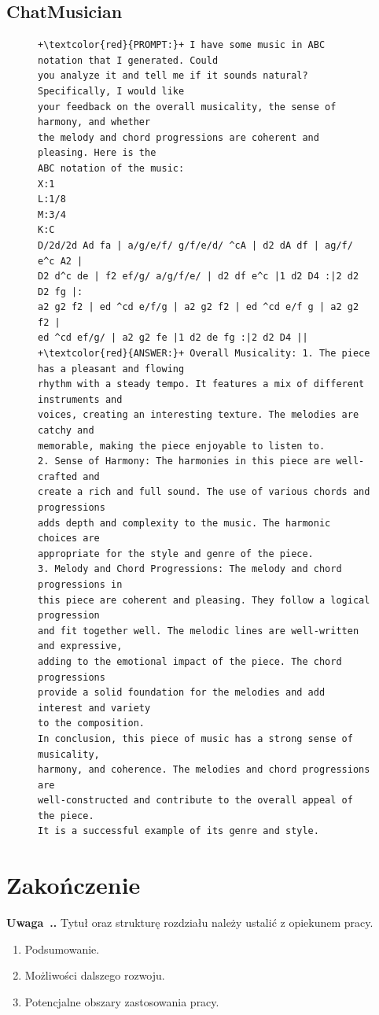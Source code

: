 \documentclass[data-science]{agh-wi} %
\newcounter{comment}[chapter]
\newenvironment{comment}[1][]{\begin{shaded}\refstepcounter{comment}
\noindent \textbf{Uwaga~\thechapter.\thecomment. #1} \rmfamily}{\end{shaded}}
\begin{document}
\section{ChatMusician}
\begin{figure}[ht!]
    \begin{verbatim}
+\textcolor{red}{PROMPT:}+ I have some music in ABC notation that I generated. Could
you analyze it and tell me if it sounds natural? Specifically, I would like 
your feedback on the overall musicality, the sense of harmony, and whether 
the melody and chord progressions are coherent and pleasing. Here is the 
ABC notation of the music:
X:1
L:1/8
M:3/4
K:C
D/2d/2d Ad fa | a/g/e/f/ g/f/e/d/ ^cA | d2 dA df | ag/f/ e^c A2 | 
D2 d^c de | f2 ef/g/ a/g/f/e/ | d2 df e^c |1 d2 D4 :|2 d2 D2 fg |:
a2 g2 f2 | ed ^cd e/f/g | a2 g2 f2 | ed ^cd e/f g | a2 g2 f2 | 
ed ^cd ef/g/ | a2 g2 fe |1 d2 de fg :|2 d2 D4 ||
+\textcolor{red}{ANSWER:}+ Overall Musicality: 1. The piece has a pleasant and flowing 
rhythm with a steady tempo. It features a mix of different instruments and
voices, creating an interesting texture. The melodies are catchy and 
memorable, making the piece enjoyable to listen to.
2. Sense of Harmony: The harmonies in this piece are well-crafted and 
create a rich and full sound. The use of various chords and progressions 
adds depth and complexity to the music. The harmonic choices are 
appropriate for the style and genre of the piece.
3. Melody and Chord Progressions: The melody and chord progressions in 
this piece are coherent and pleasing. They follow a logical progression 
and fit together well. The melodic lines are well-written and expressive, 
adding to the emotional impact of the piece. The chord progressions 
provide a solid foundation for the melodies and add interest and variety 
to the composition.
In conclusion, this piece of music has a strong sense of musicality, 
harmony, and coherence. The melodies and chord progressions are 
well-constructed and contribute to the overall appeal of the piece. 
It is a successful example of its genre and style.
    \end{verbatim}
\end{figure}

\chapter{Zakończenie}
\begin{comment}
Tytuł oraz strukturę rozdziału należy ustalić z opiekunem pracy.
\end{comment}
\begin{enumerate}
    \item Podsumowanie.
    \item Możliwości dalszego rozwoju.
    \item Potencjalne obszary zastosowania pracy.
\end{enumerate}
\appendix %
\end{document}
